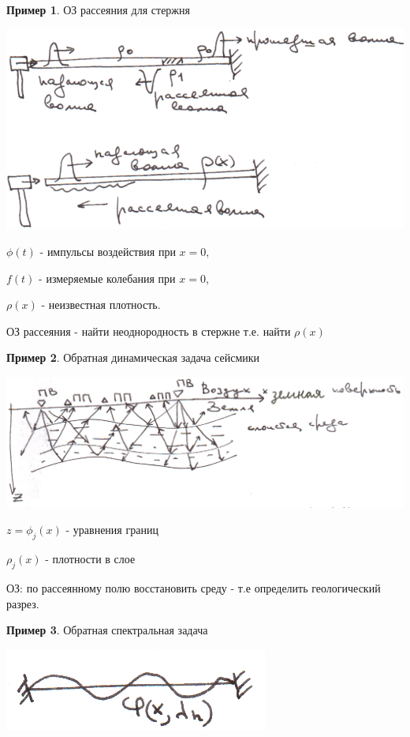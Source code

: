 \documentclass{article}
\begin{document}
\bigskip

\textbf{Пример 1}. ОЗ рассеяния для стержня

\includegraphics[scale=0.85]{example1.png}

$\phi (t)$ - импульсы воздействия при $x = 0$,

$f(t)$ - измеряемые колебания при $x = 0$,

$\rho(x)$ - неизвестная плотность.

ОЗ рассеяния - найти неоднородность в стержне т.е. найти $\rho(x)$

\newpage

\textbf{Пример 2}. Обратная динамическая задача сейсмики

\includegraphics[scale=0.75]{example2.png}

$z = \phi_j(x)$ - уравнения границ

$\rho_j(x)$ - плотности в слое

ОЗ: по рассеянному полю восстановить среду - т.е определить геологический разрез.

\bigskip

\textbf{Пример 3}. Обратная спектральная задача

\includegraphics[scale=1]{example3.png}
\end{document}
